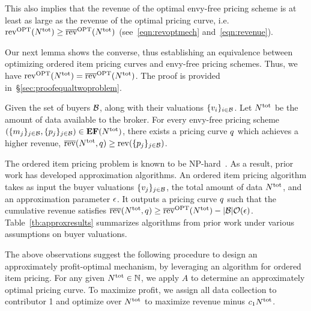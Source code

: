 This also implies that the revenue of the optimal envy-free pricing scheme is at least as large as the revenue of the optimal pricing curve, i.e. $\mathrm{rev}^{\rm OPT}(N^{\rm tot}) \geq \overline{\mathrm{rev}}^{\rm OPT}(N^{\rm tot})$ (see~\eqref{eqn:revoptmech} and~\eqref{eqn:revenue}).  

Our next lemma shows the converse, thus establishing an equivalence between optimizing ordered item pricing curves and envy-free pricing schemes.  
Thus, we have $\mathrm{rev}^{\rm OPT}(N^{\rm tot}) = \overline{\mathrm{rev}}^{\rm OPT}(N^{\rm tot})$.  
The proof  is provided in~\S\ref{sec:proofequaltwoproblem}.  


\begin{lemma}%
\label{lem:equal_two_problem}
Given the set of buyers $\mathcal{B}$, along with their valuations $\{v_{i}\}_{i\in\mathcal{B}}$.
Let $N^{\rm tot}$ be the amount of data available to the broker.
For every envy-free pricing scheme $(\{m_j\}_{j \in \mathcal{B}}, \{p_j\}_{j \in \mathcal{B}}) \in{\rm\bf EF}(N^{\rm tot})$, there exists a 
pricing curve $q$ 
which achieves a higher revenue, \ie $\overline{\mathrm{rev}}(N^{\rm tot}, q) \geq \mathrm{rev}(\{p_j\}_{j\in\mathcal{B}})$.
\end{lemma}

\insertTableApproxResults
{}
The ordered item pricing problem is known to be \textsf{NP}-hard~\citep{chawla2007algorithmic,hartline2005near}.  
As a result, prior work has developed approximation algorithms.  
An ordered item pricing algorithm takes as input the buyer valuations $\{v_{j}\}_{j\in\mathcal{B}}$, the total amount of data $N^{\rm tot}$, and an approximation parameter $\epsilon$.  
It outputs a pricing curve $q$ such that the cumulative revenue satisfies  
$\overline{\mathrm{rev}}(N^{\rm tot}, q) \geq \overline{\mathrm{rev}}^{\rm OPT}(N^{\rm tot}) - |\mathcal{B}|\mathcal{O}(\epsilon)$.
Table~\ref{tb:approxresults} summarizes algorithms from prior work under various assumptions on buyer valuations.  

\vspace{0.5 cm}
\insertOIPAlgo
{}
The above observations suggest the following procedure to design an approximately profit-optimal mechanism, by leveraging an algorithm for ordered item pricing.  
For any given $N^{\rm tot}\in\mathbb{N}$, we apply $A$ to determine an approximately optimal pricing curve.  
To maximize profit, we assign all data collection to contributor 1 and optimize over $N^{\rm tot}$ to maximize revenue minus $c_1 N^{\rm tot}$.  

